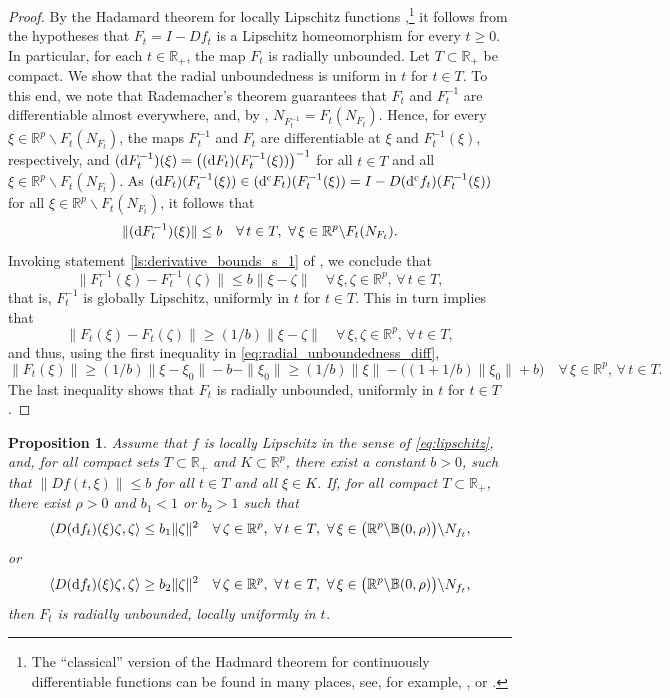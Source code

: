 \documentclass[a4paper,11pt]{article}
\newcommand{\B}{\mathbb B}
\newcommand{\R}{\mathbb R}
\numberwithin{equation}{section}
\numberwithin{figure}{section}
\numberwithin{table}{section}
\newtheorem{proposition}[theorem]{Proposition}
\begin{document}
\begin{proof}
By the Hadamard theorem for locally Lipschitz functions \cite{p82},\footnote[2]{The ``classical'' version of the Hadmard theorem for continuously differentiable functions can be found in many places, see, for example,  \cite[Theorem 15.4]{d85}, \cite{mgz94} or \cite{s80,s02}.}
it follows from the hypotheses that $F_t=I-Df_t$ is a Lipschitz homeomorphism for every $t\geq 0$.
In particular, for each $t\in\R_+$, the map $F_t$ is radially unbounded.
Let $T\subset\R_+$ be compact. We show that the radial unboundedness is uniform in $t$ for $t\in T$.
To this end, we note that Rademacher's theorem guarantees that $F_t$ and $F_t^{-1}$ are differentiable almost everywhere, and, by \cite{bd24}, $N_{F_t^{-1}}=F_t(N_{F_t})$. Hence, for every $\xi\in\R^p\backslash F_t(N_{F_t})$, the maps $F_t^{-1}$ and $F_t$ are differentiable
at $\xi$ and $F_t^{-1}(\xi)$, respectively, and $({\rm d} F_t^{-1})(\xi)=\big(({\rm d} F_t)(F_t^{-1}(\xi))\big)^{-1}$ for all $t\in T$ and all $\xi\in\R^p\backslash F_t(N_{F_t})$.
As $({\rm d} F_t)(F_t^{-1}(\xi))\in ({\rm d}^{\rm c} F_t)(F_t^{-1}(\xi))=I-D({\rm d}^{\rm c} f_t)(F_t^{-1}(\xi))$ for all $\xi\in\R^p\backslash F_t(N_{F_t})$, it follows that
\[
\|({\rm d} F_t^{-1})(\xi)\|\leq b\quad\forall\,t\in T,\,\,\forall\,\xi\in\R^p\backslash F_t(N_{F_t}).
\]
Invoking statement \ref{ls:derivative_bounds_s_1} of , we conclude that
\[
\|F_t^{-1}(\xi)-F_t^{-1}(\zeta)\|\leq b\|\xi-\zeta\|\quad\forall\,\xi,\zeta\in\R^p,\,\forall\,t\in T,
\]
that is, $F_t^{-1}$ is globally Lipschitz, uniformly in $t$ for $t\in T$. This in turn implies that
\[
\|F_t(\xi)-F_t(\zeta)\|\geq (1/b)\|\xi-\zeta\|\quad\forall\,\xi,\zeta\in\R^p,\,\forall\,t\in T,
\]
and thus, using the first inequality in \eqref{eq:radial_unboundedness_diff},
\[
\|F_t(\xi)\|\geq (1/b)\|\xi-\xi_0\|-b-\|\xi_0\|\geq(1/b)\|\xi\|-\big((1+1/b)\|\xi_0\|+b\big)\quad
\forall\,\xi\in\R^p,\,\forall\,t\in T.
\]
The last inequality shows that $F_t$ is radially unbounded, uniformly in $t$ for $t\in T$.
\end{proof}
%
\begin{proposition}\label{pro:radial_unboundedness_diff'}
Assume that $f$ is locally Lipschitz in the sense of \eqref{eq:lipschitz}, and, for
all compact sets $T\subset\R_+$ and $K\subset\R^p$, there exist a constant $b>0$,
such that $\|Df(t,\xi)\|\leq b$ for all $t\in T$ and all $\xi\in K$.
If, for all compact $T\subset\R_+$, there exist $\rho>0$ and $b_1<1$ or $b_2>1$
such that
\begin{equation}\label{eq:radial_unboundedness_diff'1}
\langle D({\rm d} f_t)(\xi)\zeta,\zeta\rangle\leq b_1\|\zeta\|^2\quad\forall\,
\zeta\in\R^p,\,\,\forall\,t\in T,\,\,\forall\,\xi\in\big(\R^p\backslash\B(0,\rho)\big)\backslash N_{f_t},
\end{equation}
or
\begin{equation}\label{eq:radial_unboundedness_diff'2}
\langle D({\rm d} f_t)(\xi)\zeta,\zeta\rangle\geq b_2\|\zeta\|^2\quad\forall\,
\zeta\in\R^p,\,\,\forall\,t\in T,\,\,\forall\,\xi\in\big(\R^p\backslash\B(0,\rho)\big)\backslash N_{f_t},
\end{equation}
then $F_t$ is radially unbounded, locally uniformly in $t$.
\end{proposition}
\end{document}
